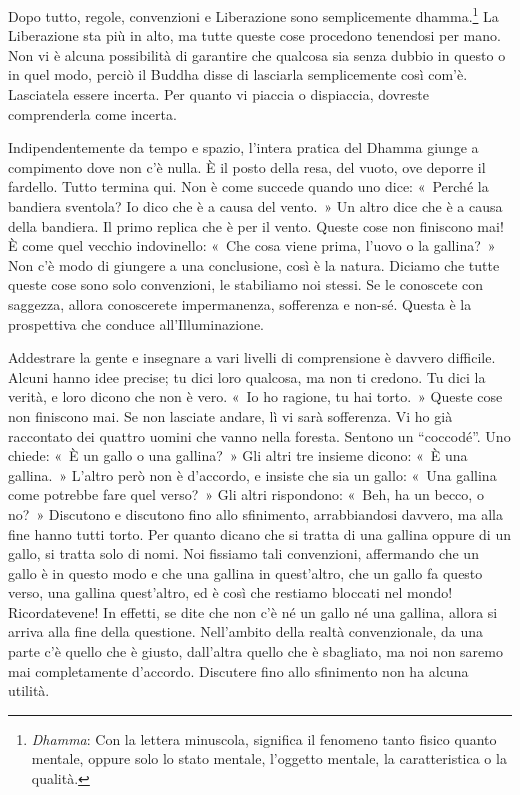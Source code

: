 Dopo tutto, regole, convenzioni e Liberazione sono semplicemente
dhamma.\footnote{\emph{Dhamma}: Con la lettera minuscola,
  significa il fenomeno tanto fisico quanto mentale, oppure solo lo
  stato mentale, l'oggetto mentale, la caratteristica o la qualità.}
La Liberazione sta più in alto, ma tutte queste cose procedono tenendosi
per mano. Non vi è alcuna possibilità di garantire che qualcosa sia
senza dubbio in questo o in quel modo, perciò il Buddha disse di
lasciarla semplicemente così com'è. Lasciatela essere incerta. Per
quanto vi piaccia o dispiaccia, dovreste comprenderla come incerta.

Indipendentemente da tempo e spazio, l'intera pratica del Dhamma giunge
a compimento dove non c'è nulla. È il posto della resa, del vuoto, ove
deporre il fardello. Tutto termina qui. Non è come succede quando uno
dice: «~Perché la bandiera sventola? Io dico che è a causa del vento.~»
Un altro dice che è a causa della bandiera. Il primo replica che è per
il vento. Queste cose non finiscono mai! È come quel vecchio
indovinello: «~Che cosa viene prima, l'uovo o la gallina?~» Non c'è modo
di giungere a una conclusione, così è la natura. Diciamo che tutte
queste cose sono solo convenzioni, le stabiliamo noi stessi. Se le
conoscete con saggezza, allora conoscerete impermanenza, sofferenza e
non-sé. Questa è la prospettiva che conduce all'Illuminazione.

Addestrare la gente e insegnare a vari livelli di comprensione è davvero
difficile. Alcuni hanno idee precise; tu dici loro qualcosa, ma non ti
credono. Tu dici la verità, e loro dicono che non è vero. «~Io ho
ragione, tu hai torto.~» Queste cose non finiscono mai. Se non lasciate
andare, lì vi sarà sofferenza. Vi ho già raccontato dei quattro uomini
che vanno nella foresta. Sentono un ``coccodé''. Uno chiede: «~È un
gallo o una gallina?~» Gli altri tre insieme dicono: «~È una gallina.~»
L'altro però non è d'accordo, e insiste che sia un gallo: «~Una gallina
come potrebbe fare quel verso?~» Gli altri rispondono: «~Beh, ha un
becco, o no?~» Discutono e discutono fino allo sfinimento, arrabbiandosi
davvero, ma alla fine hanno tutti torto. Per quanto dicano che si tratta
di una gallina oppure di un gallo, si tratta solo di nomi. Noi fissiamo
tali convenzioni, affermando che un gallo è in questo modo e che una
gallina in quest'altro, che un gallo fa questo verso, una gallina
quest'altro, ed è così che restiamo bloccati nel mondo! Ricordatevene!
In effetti, se dite che non c'è né un gallo né una gallina, allora si
arriva alla fine della questione. Nell'ambito della realtà
convenzionale, da una parte c'è quello che è giusto, dall'altra quello
che è sbagliato, ma noi non saremo mai completamente d'accordo.
Discutere fino allo sfinimento non ha alcuna utilità.

